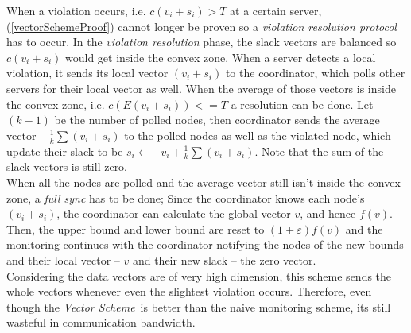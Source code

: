 \documentclass[10pt, conference]{IEEEtran}
\newcommand{\vectorScheme}{\textit{Vector Scheme}}
\begin{document}
When a violation occurs, i.e. $c(v_i+s_i) > T$ at a certain server, (\ref{vectorSchemeProof}) cannot longer be proven so a \textit{violation resolution protocol} has to occur. In the \textit{violation resolution} phase, the slack vectors are balanced so $c(v_i+s_i)$ would get inside the convex zone. When a server detects a local violation, it sends its local vector $(v_i + s_i)$ to the coordinator, which polls other servers for their local vector as well. When the average of those vectors is inside the convex zone, i.e. $c(E(v_i + s_i)) <= T$ a resolution can be done. Let $(k-1)$ be the number of polled nodes, then coordinator sends the average vector -- $\frac{1}{k}\sum{(v_i + s_i)}$ to the polled nodes as well as the violated node, which update their slack to be $s_i \leftarrow -v_i + \frac{1}{k}\sum{(v_i + s_i)} $. Note that the sum of the slack vectors is still zero. \\
When all the nodes are polled and the average vector still isn't inside the convex zone, a \textit{full sync} has to be done; Since the coordinator knows each node's $(v_i + s_i)$, the coordinator can calculate the global vector $v$, and hence $f(v)$. Then, the upper bound and lower bound are reset to $(1 \pm \varepsilon )f(v)$ and the monitoring continues with the coordinator notifying the nodes of the new bounds and their local vector -- $v$ and their new slack -- the zero vector. \\
Considering the data vectors are of very high dimension, this scheme sends the whole vectors whenever even the slightest violation occurs. Therefore, even though the \vectorScheme \  is better than the naive monitoring scheme, its still wasteful in communication bandwidth.

\end{document}
